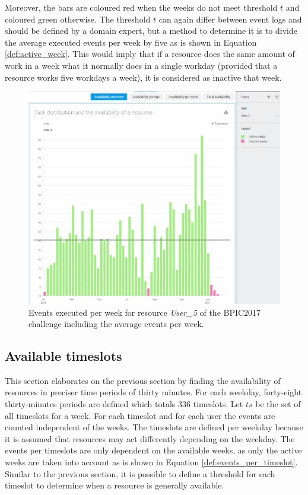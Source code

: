 Moreover, the bars are coloured red when the weeks do not meet threshold $t$ and coloured green otherwise. The threshold $t$ can again differ between event logs and should be defined by a domain expert, but a method to determine it is to divide the average executed events per week by five as is shown in Equation \ref{def:active_week}. This would imply that if a resource does the same amount of work in a week what it normally does in a single workday (provided that a resource works five workdays a week), it is considered as inactive that week. 

\begin{figure}[h]
	\centering
    \includegraphics[width=\textwidth]{figures/available_weeks}
    \caption{Events executed per week for resource \textit{User\_5} of the BPIC2017 challenge including the average events per week.}
    \label{fig:available_weeks}
\end{figure}

\subsection{Available timeslots}
This section elaborates on the previous section by finding the availability of resources in preciser time periods of thirty minutes. For each weekday, forty-eight thirty-minutes periods are defined which totals 336 timeslots. Let $ts$ be the set of all timeslots for a week. For each timeslot and for each user the events are counted independent of the weeks. The timeslots are defined per weekday because it is assumed that resources may act differently depending on the weekday. The events per timeslots are only dependent on the available weeks, as only the active weeks are taken into account as is shown in Equation \ref{def:events_per_timeslot}. Similar to the previous section, it is possible to define a threshold for each timeslot to determine when a resource is generally available. 

